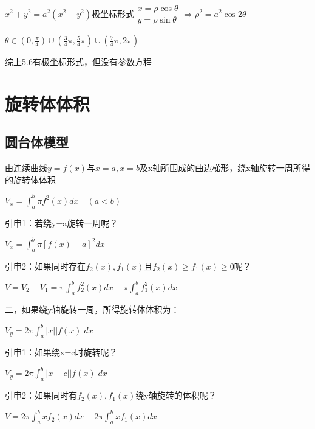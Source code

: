 \documentclass[a4paper,11pt]{book}
\begin{document}
$x^{2}+y^{2}=a^{2}(x^{2}-y^{2})$极坐标形式$\begin{array}{l}
    x=\rho \cos \theta \\
    y=\rho \sin \theta
    \end{array}\Rightarrow \rho ^{2}=a^{2}\cos 2\theta$


    $\theta \in \left(0, \frac{\pi}{4}\right) \cup\left(\frac{3}{4} \pi, \frac{5}{4} \pi\right) \cup\left(\frac{7}{4} \pi, 2 \pi\right)$

综上5.6有极坐标形式，但没有参数方程

\section*{旋转体体积}
\subsection*{圆台体模型}

由连续曲线$y=f(x)$与$x=a,x=b$及x轴所围成的曲边梯形，绕x轴旋转一周所得的旋转体体积

\vspace{2ex}

$\displaystyle{V_{x}=\int_{a}^{b} \pi f^{2}(x) d x \quad(a<b)}$

\vspace{2ex}

引申1：若绕y=a旋转一周呢？

\vspace{2ex}

$\displaystyle{V_{x}=\int_{a}^{b} \pi[f(x)-a]^{2} d x}$

\vspace{2ex}

引申2：如果同时存在$f_{2}(x), f_{1}(x)$且$f_{2}(x)\ge f_{1}(x) \ge 0$呢？
   
\vspace{2ex}

$\displaystyle{V=V_{2}-V_{1}=\pi \int_{a}^{b} f_{2}^{2}(x) d x-\pi \int_{a}^{b} f_{1}^{2}(x) d x}$

\vspace{2ex}

二，如果绕y轴旋转一周，所得旋转体体积为：

\vspace{2ex}

    $\displaystyle{V_{ y}=2 \pi \int_{a}^{b}|x| | f(x)| d x}$

\vspace{2ex}
    
    引申1：如果绕x=c时旋转呢？

\vspace{2ex}

    $\displaystyle{V_{ y}=2 \pi \int_{a}^{b}|x-c| | f(x)| d x}$

\vspace{2ex}

    引申2：如果同时有$f_{2}(x),f_{1}(x)$绕y轴旋转的体积呢？

\vspace{2ex}

    $\displaystyle{V=2 \pi \int_{a}^{b} x f_{2}(x) d x-2 \pi \int_{a}^{b} x f_{1}(x) d x}$
\end{document}

